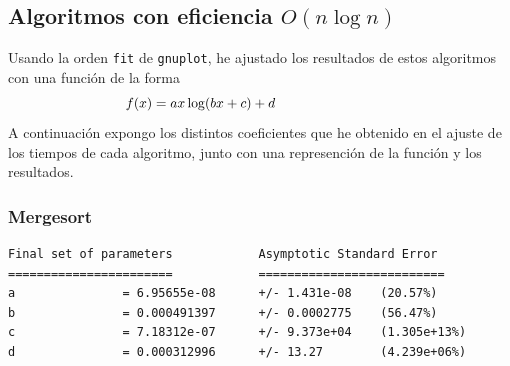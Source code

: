 \documentclass[a4]{article}
\begin{document}
\begin{figure}[H] \centering
{}
\end{figure}

\vspace{-10mm}

\subsection{Algoritmos con eficiencia $O(n\log n)$}

\begin{flushleft}
  Usando la orden \texttt{fit} de \texttt{gnuplot}, he ajustado los
  resultados de estos algoritmos con una función de la
  forma \[\hspace{-30mm}f(x)=ax\log(bx+c)+d\] A continuación expongo
  los distintos coeficientes que he obtenido en el ajuste de los
  tiempos de cada algoritmo, junto con una represención de la función
  y los resultados.
\end{flushleft}

\subsubsection{Mergesort}

\begin{verbatim}
Final set of parameters            Asymptotic Standard Error
=======================            ==========================
a               = 6.95655e-08      +/- 1.431e-08    (20.57%)
b               = 0.000491397      +/- 0.0002775    (56.47%)
c               = 7.18312e-07      +/- 9.373e+04    (1.305e+13%)
d               = 0.000312996      +/- 13.27        (4.239e+06%)
\end{verbatim}

\begin{figure}[H] \centering
{}
\end{figure}
\end{document}
